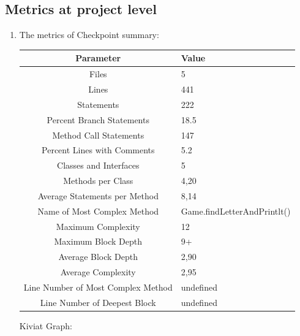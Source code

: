 \documentclass{article}
\begin{document}
\subsection{Metrics at project level}



\begin{enumerate}
\item
The metrics of Checkpoint summary:
\vspace {0.08 cm}

\begin{tabulary}{1.0\textwidth}{| C | l |}
	\hline
	\textbf{Parameter} & \textbf{Value} \\ \hline
	Files & 5 \\ \hline
	Lines & 441 \\ \hline
	Statements & 222 \\ \hline
	Percent Branch Statements & 18.5 \\ \hline
	Method Call Statements & 147 \\ \hline
	Percent Lines with Comments & 5.2 \\ \hline
	Classes and Interfaces & 5 \\ \hline
	Methods per Class & 4,20 \\ \hline
	Average Statements per Method & 8,14 \\ \hline
	Name of Most Complex Method & Game.findLetterAndPrintlt() \\ \hline
	Maximum Complexity & 12 \\ \hline
	Maximum Block Depth & 9+ \\ \hline
	Average Block Depth & 2,90 \\ \hline
	Average Complexity & 2,95 \\ \hline
	Line Number of Most Complex Method & undefined \\ \hline
	Line Number of Deepest Block & undefined \\ \hline
\end{tabulary}
\newline
\vspace*{0.5 cm}
\newline
Kiviat Graph:
\vspace {0.08 cm}

\end{enumerate}
\end{document}
